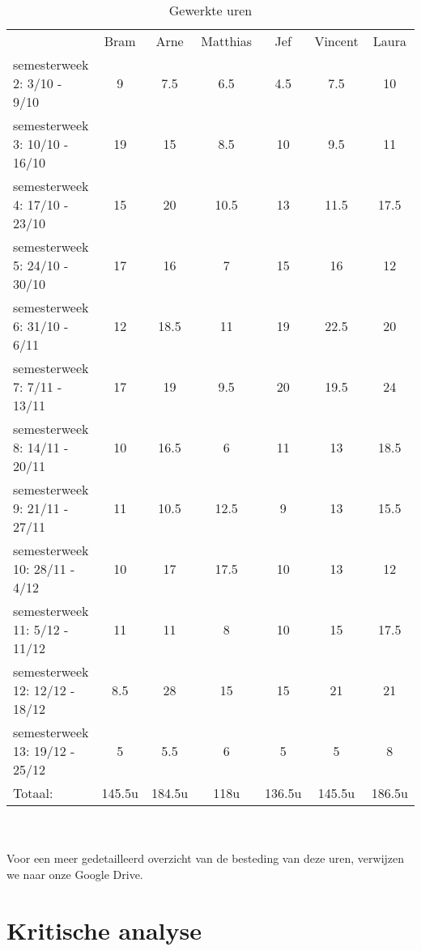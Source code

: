 \documentclass[]{penoverslag}
\begin{document}
\begin{table}[h]
\begin{tabular}{ l c c c c c c }
	& Bram & Arne & Matthias &  Jef & Vincent & Laura\\
	semesterweek 2: 3/10 - 9/10 & 9 & 7.5 & 6.5 & 4.5 & 7.5 & 10 \\	
	semesterweek 3: 10/10 - 16/10 & 19 & 15 & 8.5 & 10 & 9.5 & 11 \\
	semesterweek 4: 17/10 - 23/10 & 15 & 20 & 10.5 & 13 & 11.5 & 17.5\\
	semesterweek 5: 24/10 - 30/10 & 17 & 16 & 7 & 15 & 16 & 12\\
	semesterweek 6: 31/10 - 6/11 & 12 & 18.5 & 11 & 19 & 22.5 & 20\\
	semesterweek 7: 7/11 - 13/11 & 17 & 19 & 9.5 & 20 & 19.5 & 24\\
	semesterweek 8: 14/11 - 20/11 & 10 & 16.5 & 6 & 11 & 13 & 18.5\\
	semesterweek 9: 21/11 - 27/11 & 11 & 10.5 & 12.5 & 9 & 13 & 15.5\\
	semesterweek 10: 28/11 - 4/12 & 10 & 17 & 17.5 & 10 & 13 & 12\\
	semesterweek 11: 5/12 - 11/12 & 11 & 11 & 8 & 10 & 15 & 17.5\\
	semesterweek 12: 12/12 - 18/12  & 8.5 & 28 & 15 & 15 & 21 & 21\\
	semesterweek 13: 19/12 - 25/12  & 5 & 5.5 & 6 & 5 & 5 & 8\\ \hline
	Totaal: & 145.5u & 184.5u & 118u	& 136.5u & 145.5u & 186.5u
\end{tabular}
\caption{Gewerkte uren}
\label{tabel: gewerkte uren}
\end{table}
\\
\\
Voor een meer gedetailleerd overzicht van de besteding van deze uren, verwijzen we naar onze Google Drive.


\section{Kritische analyse}
\end{document}

